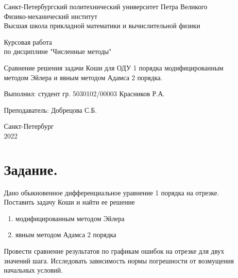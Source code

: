 \documentclass[a4paper, 12pt]{article}
\theoremstyle{mythm}
\begin{document}
	\begin{titlepage}
		\begin{center}
			Санкт-Петербургский политехнический университет Петра Великого \\ Физико-механический институт \\ Высшая школа прикладной математики и вычислительной физики
		\end{center}
		\vspace{10em}
		\begin{center}
			\Large Курсовая работа \\ по дисциплине "Численные методы"
		\end{center}
		\vspace{1em}
		\begin{center}
			\Huge Сравнение решения задачи Коши для ОДУ 1 порядка модифицированным методом Эйлера и явным методом Адамса 2 порядка.
		\end{center}
		\vspace{15em}
		{\Large 
			
			Выполнил: \hfill студент гр. 5030102/00003 Красников Р.А.
			\vspace{1em}
			
			Преподаватель: \hfill Добрецова С.Б.}
		\vspace{\fill}
		\begin{center}
			Санкт-Петербург \\ 2022
		\end{center}
	\end{titlepage}
	\newpage
	
	\tableofcontents
	
	\newpage
	
	\section{Задание.}
	
	Дано обыкновенное дифференциальное уравнение 1 порядка на отрезке. Поставить задачу Коши и найти ее решение
	\begin{enumerate}
		\item модифицированным методом Эйлера
		\item явным методом Адамса 2 порядка
	\end{enumerate}
	
	Провести сравнение результатов по графикам ошибок на отрезке для двух значений шага. Исследовать зависимость нормы погрешности от возмущения начальных условий.
	
\end{document}
